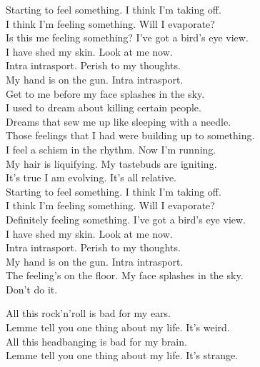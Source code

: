 Starting to feel something. I think I'm taking off. \\
I think I'm feeling something. Will I evaporate? \\
Is this me feeling something? I've got a bird's eye view. \\
I have shed my skin. Look at me now. \\

Intra intrasport. Perish to my thoughts. \\
My hand is on the gun. Intra intrasport. \\
Get to me before my face splashes in the sky. \\

I used to dream about killing certain people. \\
Dreams that sew me up like sleeping with a needle. \\
Those feelings that I had were building up to something. \\
I feel a schism in the rhythm. Now I'm running. \\

My hair is liquifying. My tastebuds are igniting. \\
It's true I am evolving. It's all relative. \\

Starting to feel something. I think I'm taking off. \\
I think I'm feeling something. Will I evaporate? \\
Definitely feeling something. I've got a bird's eye view. \\
I have shed my skin. Look at me now. \\

Intra intrasport. Perish to my thoughts. \\
My hand is on the gun. Intra intrasport. \\
The feeling's on the floor. My face splashes in the sky. \\

Don't do it. \\




All this rock'n'roll is bad for my ears. \\
Lemme tell you one thing about my life. It's weird. \\
All this headbanging is bad for my brain. \\
Lemme tell you one thing about my life. It's strange. \\

